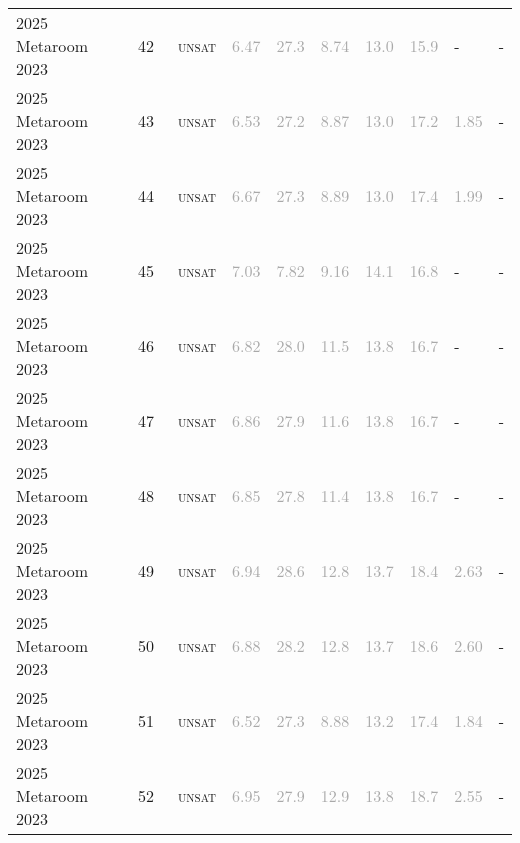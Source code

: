 \begin{center}
{\begin{longtable}{@{}llllllllll@{}}
2025 Metaroom 2023 & 42 & ~\textsc{unsat} & \textcolor{darkgray}{6.47} & \textcolor{darkgray}{27.3} & \textcolor{darkgray}{8.74} & \textcolor{darkgray}{13.0} & \textcolor{darkgray}{15.9} & - & - \\
2025 Metaroom 2023 & 43 & ~\textsc{unsat} & \textcolor{darkgray}{6.53} & \textcolor{darkgray}{27.2} & \textcolor{darkgray}{8.87} & \textcolor{darkgray}{13.0} & \textcolor{darkgray}{17.2} & \textcolor{darkgray}{1.85} & - \\
2025 Metaroom 2023 & 44 & ~\textsc{unsat} & \textcolor{darkgray}{6.67} & \textcolor{darkgray}{27.3} & \textcolor{darkgray}{8.89} & \textcolor{darkgray}{13.0} & \textcolor{darkgray}{17.4} & \textcolor{darkgray}{1.99} & - \\
2025 Metaroom 2023 & 45 & ~\textsc{unsat} & \textcolor{darkgray}{7.03} & \textcolor{darkgray}{7.82} & \textcolor{darkgray}{9.16} & \textcolor{darkgray}{14.1} & \textcolor{darkgray}{16.8} & - & - \\
2025 Metaroom 2023 & 46 & ~\textsc{unsat} & \textcolor{darkgray}{6.82} & \textcolor{darkgray}{28.0} & \textcolor{darkgray}{11.5} & \textcolor{darkgray}{13.8} & \textcolor{darkgray}{16.7} & - & - \\
2025 Metaroom 2023 & 47 & ~\textsc{unsat} & \textcolor{darkgray}{6.86} & \textcolor{darkgray}{27.9} & \textcolor{darkgray}{11.6} & \textcolor{darkgray}{13.8} & \textcolor{darkgray}{16.7} & - & - \\
2025 Metaroom 2023 & 48 & ~\textsc{unsat} & \textcolor{darkgray}{6.85} & \textcolor{darkgray}{27.8} & \textcolor{darkgray}{11.4} & \textcolor{darkgray}{13.8} & \textcolor{darkgray}{16.7} & - & - \\
2025 Metaroom 2023 & 49 & ~\textsc{unsat} & \textcolor{darkgray}{6.94} & \textcolor{darkgray}{28.6} & \textcolor{darkgray}{12.8} & \textcolor{darkgray}{13.7} & \textcolor{darkgray}{18.4} & \textcolor{darkgray}{2.63} & - \\
2025 Metaroom 2023 & 50 & ~\textsc{unsat} & \textcolor{darkgray}{6.88} & \textcolor{darkgray}{28.2} & \textcolor{darkgray}{12.8} & \textcolor{darkgray}{13.7} & \textcolor{darkgray}{18.6} & \textcolor{darkgray}{2.60} & - \\
2025 Metaroom 2023 & 51 & ~\textsc{unsat} & \textcolor{darkgray}{6.52} & \textcolor{darkgray}{27.3} & \textcolor{darkgray}{8.88} & \textcolor{darkgray}{13.2} & \textcolor{darkgray}{17.4} & \textcolor{darkgray}{1.84} & - \\
2025 Metaroom 2023 & 52 & ~\textsc{unsat} & \textcolor{darkgray}{6.95} & \textcolor{darkgray}{27.9} & \textcolor{darkgray}{12.9} & \textcolor{darkgray}{13.8} & \textcolor{darkgray}{18.7} & \textcolor{darkgray}{2.55} & - \\

\end{longtable}}
\end{center}
